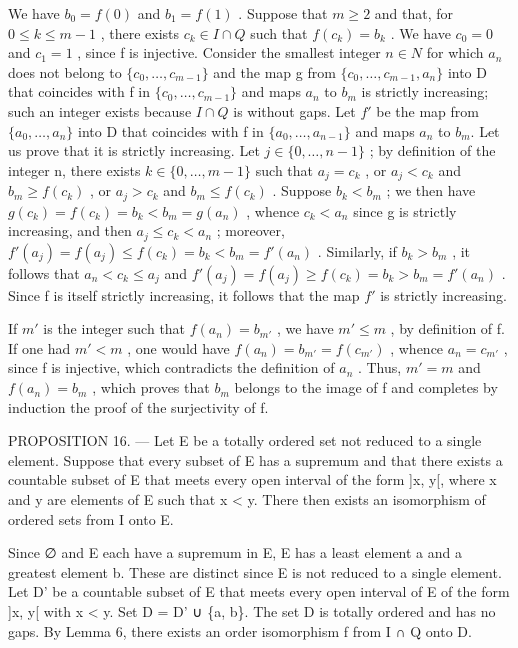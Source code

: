 We have \(b_{0}=f(0)\) and \(b_{1}=f(1)\) . Suppose that \(m\geqslant2\) and that, for \(0\leqslant k\leqslant m-1\) , there exists \(c_{k}\in I\cap Q\) such that \(f(c_{k})=b_{k}\) . We have \(c_{0}=0\) and \(c_{1}=1\) , since f is injective. Consider the smallest integer \(n\in N\) for which \(a_{n}\) does not belong to \(\{c_{0},\ldots,c_{m-1}\}\) and the map g from \(\{c_{0},\ldots,c_{m-1},a_{n}\}\) into D that coincides with f in \(\{c_{0},\ldots,c_{m-1}\}\) and maps \(a_{n}\) to \(b_{m}\) is strictly increasing; such an integer exists because \(I\cap Q\) is without gaps. Let \(f'\) be the map from \(\{a_{0},\ldots,a_{n}\}\) into D that coincides with f in \(\{a_{0},\ldots,a_{n-1}\}\) and maps \(a_{n}\) to \(b_{m}\). Let us prove that it is strictly increasing. Let \(j\in\{0,\ldots,n-1\}\) ; by definition of the integer n, there exists \(k\in\{0,\ldots,m-1\}\) such that \(a_{j}=c_{k}\) , or \(a_{j}<c_{k}\) and \(b_{m}\geqslant f(c_{k})\) , or \(a_{j}>c_{k}\) and \(b_{m}\leqslant f(c_{k})\) . Suppose \(b_{k}<b_{m}\) ; we then have \(g(c_{k})=f(c_{k})=b_{k}<b_{m}=g(a_{n})\) , whence \(c_{k}<a_{n}\) since g is strictly increasing, and then \(a_{j}\leqslant c_{k}<a_{n}\) ; moreover, \(f'(a_{j})=f(a_{j})\leqslant f(c_{k})=b_{k}<b_{m}=f'(a_{n})\) . Similarly, if \(b_{k}>b_{m}\) , it follows that \(a_{n}<c_{k}\leqslant a_{j}\) and \(f'(a_{j})=f(a_{j})\geqslant f(c_{k})=b_{k}>b_{m}=f'(a_{n})\) . Since f is itself strictly increasing, it follows that the map \(f'\) is strictly increasing.

If \(m'\) is the integer such that \(f(a_n) = b_{m'}\) , we have \(m' \leqslant m\) , by definition of f. If one had \(m' < m\) , one would have \(f(a_n) = b_{m'} = f(c_{m'})\) , whence \(a_n = c_{m'}\) , since f is injective, which contradicts the definition of \(a_n\) . Thus, \(m' = m\) and \(f(a_n) = b_m\) , which proves that \(b_m\) belongs to the image of f and completes by induction the proof of the surjectivity of f.

PROPOSITION 16. --- Let E be a totally ordered set not reduced to a single element. Suppose that every subset of E has a supremum and that there exists a countable subset of E that meets every open interval of the form {]}x, y{[}, where x and y are elements of E such that x \textless{} y. There then exists an isomorphism of ordered sets from I onto E.

Since ∅ and E each have a supremum in E, E has a least element a and a greatest element b. These are distinct since E is not reduced to a single element. Let D' be a countable subset of E that meets every open interval of E of the form {]}x, y{[} with x \textless{} y. Set D = D' ∪ \{a, b\}. The set D is totally ordered and has no gaps. By Lemma 6, there exists an order isomorphism f from I ∩ Q onto D.

